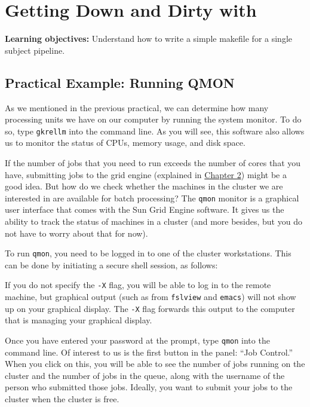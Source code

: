 \chapter{Getting Down and Dirty with \maken{}}
\label{sec:practicum3}

\textbf{Learning objectives:} Understand how to write a simple makefile for a single subject pipeline.

\section{Practical Example: Running QMON}
As we mentioned in the previous practical, we can determine how many processing units we have on our computer by running the system monitor. To do so, type \texttt{gkrellm} into the command line.  As you will see, this software also allows us to monitor the status of CPUs, memory usage, and disk space. 

If the number of jobs that you need to run exceeds the number of cores that you have, submitting jobs to the grid engine (explained in \hyperref[sec:gridengine]{Chapter 2}) might be a good idea. But how do we check whether the machines in the cluster we are interested in are available for batch processing? The \texttt{qmon} monitor is a graphical user interface that comes with the Sun Grid Engine software. It gives us the ability to track the status of machines in a cluster (and more besides, but you do not have to worry about that for now). 

To run \texttt{qmon}, you need to be logged in to one of the cluster workstations. This can be done by initiating a secure shell session, as follows:

If you do not specify the \texttt{-X} flag, you will be able to log in to the remote machine, but graphical output (such as from \texttt{fslview} and \texttt{emacs}) will not show up on your graphical display. The \texttt{-X} flag forwards this output to the computer that is managing your graphical display. 

Once you have entered your password at the prompt, type \texttt{qmon} into the command line. Of interest to us is the first button in the panel: ``Job Control.'' When you click on this, you will be able to see the number of jobs running on the cluster and the number of jobs in the queue, along with the username of the person who submitted those jobs. Ideally, you want to submit your jobs to the cluster when the cluster is free. 

